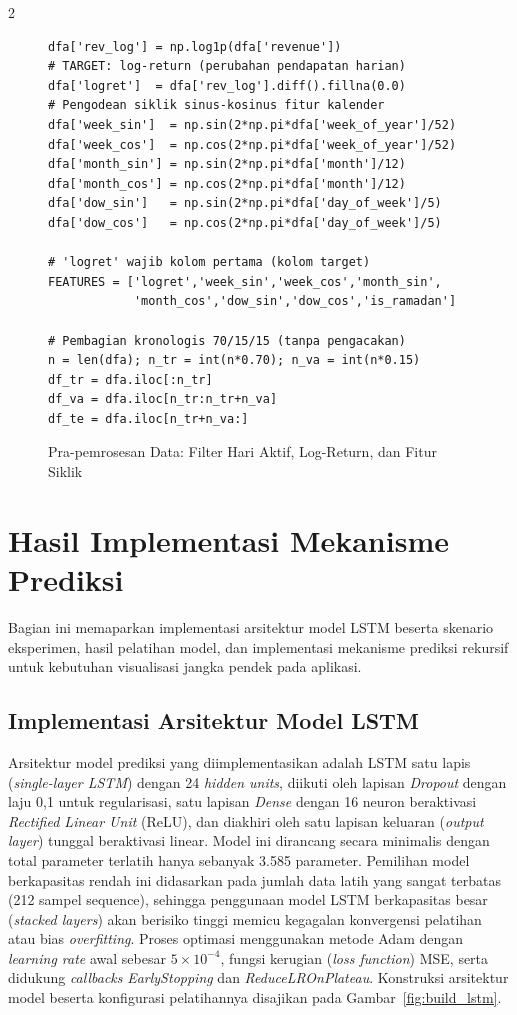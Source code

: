 \documentclass[12pt, a4paper, onecolumn, oneside]{report}
\begin{document}
\begin{spacing}{2}
\begin{figure}[H]
\begin{lstlisting}
dfa['rev_log'] = np.log1p(dfa['revenue'])
# TARGET: log-return (perubahan pendapatan harian)
dfa['logret']  = dfa['rev_log'].diff().fillna(0.0)
# Pengodean siklik sinus-kosinus fitur kalender
dfa['week_sin']  = np.sin(2*np.pi*dfa['week_of_year']/52)
dfa['week_cos']  = np.cos(2*np.pi*dfa['week_of_year']/52)
dfa['month_sin'] = np.sin(2*np.pi*dfa['month']/12)
dfa['month_cos'] = np.cos(2*np.pi*dfa['month']/12)
dfa['dow_sin']   = np.sin(2*np.pi*dfa['day_of_week']/5)
dfa['dow_cos']   = np.cos(2*np.pi*dfa['day_of_week']/5)

# 'logret' wajib kolom pertama (kolom target)
FEATURES = ['logret','week_sin','week_cos','month_sin',
            'month_cos','dow_sin','dow_cos','is_ramadan']

# Pembagian kronologis 70/15/15 (tanpa pengacakan)
n = len(dfa); n_tr = int(n*0.70); n_va = int(n*0.15)
df_tr = dfa.iloc[:n_tr]
df_va = dfa.iloc[n_tr:n_tr+n_va]
df_te = dfa.iloc[n_tr+n_va:]
\end{lstlisting}
\caption{Pra-pemrosesan Data: Filter Hari Aktif, Log-Return, dan Fitur Siklik}
\label{fig:preprocessing}
\end{figure}

\section{Hasil Implementasi Mekanisme Prediksi}

Bagian ini memaparkan implementasi arsitektur model LSTM beserta skenario eksperimen, hasil pelatihan model, dan implementasi mekanisme prediksi rekursif untuk kebutuhan visualisasi jangka pendek pada aplikasi.

\subsection{Implementasi Arsitektur Model LSTM}

Arsitektur model prediksi yang diimplementasikan adalah LSTM satu lapis (\textit{single-layer LSTM}) dengan 24 \textit{hidden units}, diikuti oleh lapisan \textit{Dropout} dengan laju 0,1 untuk regularisasi, satu lapisan \textit{Dense} dengan 16 neuron beraktivasi \textit{Rectified Linear Unit} (ReLU), dan diakhiri oleh satu lapisan keluaran (\textit{output layer}) tunggal beraktivasi linear. Model ini dirancang secara minimalis dengan total parameter terlatih hanya sebanyak 3.585 parameter. Pemilihan model berkapasitas rendah ini didasarkan pada jumlah data latih yang sangat terbatas (212 sampel sequence), sehingga penggunaan model LSTM berkapasitas besar (\textit{stacked layers}) akan berisiko tinggi memicu kegagalan konvergensi pelatihan atau bias \textit{overfitting}. Proses optimasi menggunakan metode Adam dengan \textit{learning rate} awal sebesar $5 \times 10^{-4}$, fungsi kerugian (\textit{loss function}) MSE, serta didukung \textit{callbacks} \textit{EarlyStopping} dan \textit{ReduceLROnPlateau}. Konstruksi arsitektur model beserta konfigurasi pelatihannya disajikan pada Gambar~\ref{fig:build_lstm}.


\end{spacing}
\end{document}
